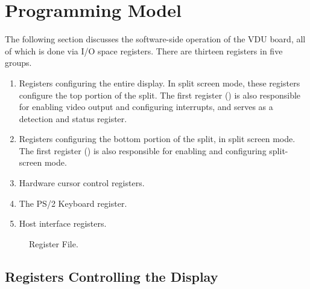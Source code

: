 \section{Programming Model}

The following section discusses the software-side operation of the VDU board,
all of which is done via I/O space registers. There are thirteen registers in five groups.

\begin{enumerate}
  \item Registers configuring the entire display. In split screen mode, these
    registers configure the top portion of the split. The first register
    () is also responsible for enabling video output and configuring
    interrupts, and serves as a detection and status register.
  \item Registers configuring the bottom portion of the split, in split screen
    mode. The first register () is also responsible for enabling and
    configuring split-screen mode.
  \item Hardware cursor control registers.
  \item The PS/2 Keyboard register.
  \item Host interface registers.
\end{enumerate}



\begin{figure}
 \centering
 
 \caption[Register File]{\label{fig:vdu-register-file} Register File.}
\end{figure}




\subsection{Registers Controlling the Display}

